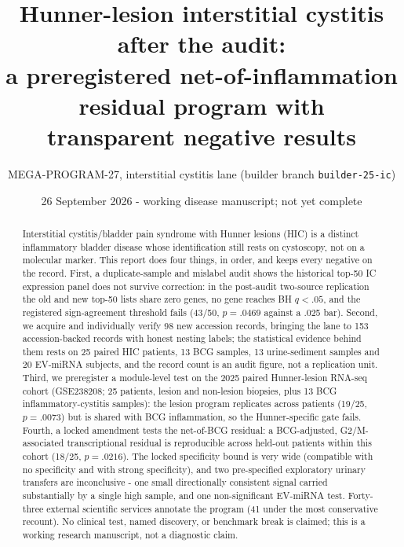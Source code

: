 \documentclass[11pt,a4paper]{article}
\title{Hunner-lesion interstitial cystitis after the audit:\\
a preregistered net-of-inflammation residual program with\\
transparent negative results}
\author{MEGA-PROGRAM-27, interstitial cystitis lane (builder branch \texttt{builder-25-ic})}
\date{26 September 2026 - working disease manuscript; not yet complete}
\begin{document}
\maketitle
\begin{abstract}
Interstitial cystitis/bladder pain syndrome with Hunner lesions (HIC) is a
distinct inflammatory bladder disease whose identification still rests on
cystoscopy, not on a molecular marker. This report does four things, in order, and keeps
every negative on the record. First, a duplicate-sample and mislabel audit shows
the historical top-50 IC expression panel does not survive correction: in the
post-audit two-source replication the old and new top-50 lists share zero genes,
no gene reaches BH $q<.05$, and the registered sign-agreement threshold fails
(43/50, $p=.0469$ against a .025 bar). Second, we acquire and individually
verify 98 new accession records, bringing the lane to 153 accession-backed
records with honest nesting labels; the statistical evidence behind them rests
on 25 paired HIC patients, 13 BCG samples, 13 urine-sediment samples and 20
EV-miRNA subjects, and the record count is an audit figure, not a replication
unit. Third, we preregister a module-level test on
the 2025 paired Hunner-lesion RNA-seq cohort (GSE238208; 25 patients, lesion and
non-lesion biopsies, plus 13 BCG inflammatory-cystitis samples): the lesion
program replicates across patients (19/25, $p=.0073$) but is shared with BCG
inflammation, so the Hunner-specific gate fails. Fourth, a locked amendment
tests the net-of-BCG residual: a BCG-adjusted, G2/M-associated transcriptional
residual is reproducible across held-out patients within this cohort (18/25,
$p=.0216$). The locked specificity bound is very wide (compatible with no
specificity and with strong specificity), and two pre-specified exploratory
urinary transfers are inconclusive - one small directionally consistent signal
carried substantially by a single high sample, and one non-significant
EV-miRNA test. Forty-three external
scientific services annotate the program (41 under the most conservative
recount). No clinical test, named discovery, or benchmark break is claimed; this
is a working research manuscript, not a diagnostic claim.
\end{abstract}
\tableofcontents\clearpage
\end{document}
